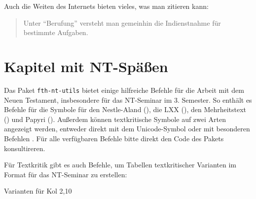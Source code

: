 \documentclass{scrreport}
\begin{document}
Auch die Weiten des Internets bieten vieles, was man zitieren kann: \blockcquote[][]{strecker}{Unter \enquote{Berufung} versteht man gemeinhin die \textelp{} Indienstnahme für bestimmte Aufgaben.}

\chapter{Kapitel mit NT-Späßen}
Das Paket \texttt{fth-nt-utils} bietet einige hilfreiche Befehle für die Arbeit mit dem Neuen Testament, insbesondere für das NT-Seminar im 3. Semester. So enthält es Befehle für die Symbole für den Nestle-Aland (\na), die LXX (\lxx), den Mehrheitstext (\majoritytext) und Papyri (). Außerdem können textkritische Symbole auf zwei Arten angezeigt werden, entweder direkt mit dem Unicode-Symbol  oder mit besonderen Befehlen \tcOmissionStart{} \tcOmissionEnd. Für alle verfügbaren Befehle bitte direkt den Code des Pakets konsultireren.

Für Textkritik gibt es auch Befehle, um Tabellen textkritischer Varianten im Format für das NT-Seminar zu erstellen:
\begin{table}[ht]
    \centering
    \begin{textvarianttable}
    
    
    \end{textvarianttable}

    \caption{Varianten für Kol 2,10 }
\end{table}
\end{document}
